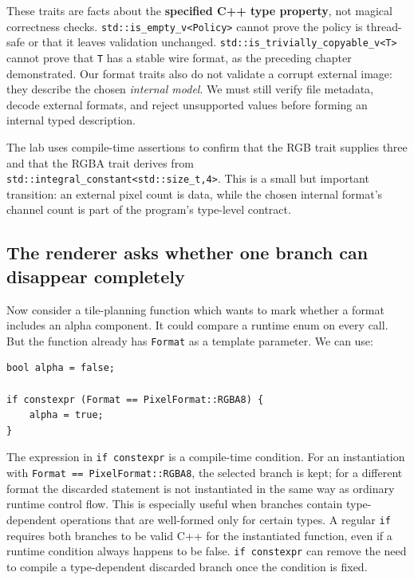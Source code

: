 These traits are facts about the \textbf{specified C++ type property}, not magical correctness checks. \texttt{std::is\_empty\_v\textless{}Policy\textgreater{}} cannot prove the policy is thread-safe or that it leaves validation unchanged. \texttt{std::is\_trivially\_copyable\_v\textless{}T\textgreater{}} cannot prove that \texttt{T} has a stable wire format, as the preceding chapter demonstrated. Our format traits also do not validate a corrupt external image: they describe the chosen \emph{internal model}. We must still verify file metadata, decode external formats, and reject unsupported values before forming an internal typed description.

The lab uses compile-time assertions to confirm that the RGB trait supplies three and that the RGBA trait derives from \texttt{std::integral\_constant\textless{}std::size\_t,4\textgreater{}}. This is a small but important transition: an external pixel count is data, while the chosen internal format's channel count is part of the program's type-level contract.

\subsection{The renderer asks whether one branch can disappear completely}\label{05-engine-i-ch005-the-renderer-asks-whether-one-branch-can-disappear-completely}

Now consider a tile-planning function which wants to mark whether a format includes an alpha component. It could compare a runtime enum on every call. But the function already has \texttt{Format} as a template parameter. We can use:

\begin{verbatim}
bool alpha = false;

if constexpr (Format == PixelFormat::RGBA8) {
    alpha = true;
}
\end{verbatim}

The expression in \texttt{if\ constexpr} is a compile-time condition. For an instantiation with \texttt{Format\ ==\ PixelFormat::RGBA8}, the selected branch is kept; for a different format the discarded statement is not instantiated in the same way as ordinary runtime control flow. This is especially useful when branches contain type-dependent operations that are well-formed only for certain types. A regular \texttt{if} requires both branches to be valid C++ for the instantiated function, even if a runtime condition always happens to be false. \texttt{if\ constexpr} can remove the need to compile a type-dependent discarded branch once the condition is fixed.


